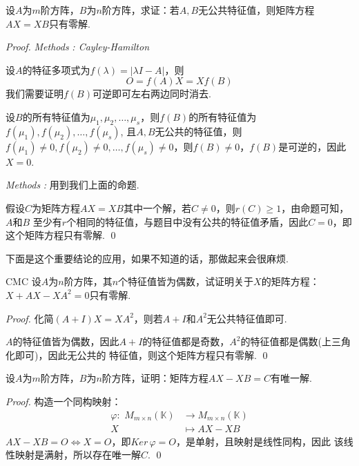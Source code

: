 \begin{proposition}
	设$A$为$m$阶方阵，$B$为$n$阶方阵，求证：若$A,B$无公共特征值，则矩阵方程$AX=XB$只有零解.
\end{proposition}

\begin{proof}
	\emph{Methods\,\,\uppercase\expandafter{}: Cayley-Hamilton}

	设$A$的特征多项式为$f(\lambda) = | \lambda I - A | $，则
	$$
		O = f(A)X = Xf(B)
	$$
	我们需要证明$f(B)$可逆即可左右两边同时消去.

	设$B$的所有特征值为$\mu_1, \mu_2, \dots, \mu_s$，则$f(B)$的所有特征值为$f(\mu_1),f(\mu_2),\dots,f(\mu_s)$,
	且$A,B$无公共的特征值，则$f(\mu_1) \neq 0, f(\mu_2) \neq 0, \dots, f(\mu_s) \neq 0$，则$f(B)\neq 0$，$f(B)$是可逆的，因此$X=0$. 
	
	\emph{Methods\,\,\uppercase\expandafter{}:}
	用到我们上面的命题.

	假设$C$为矩阵方程$AX=XB$其中一个解，若$C \neq 0$，则$r(C) \geq 1$，由命题可知，$A$和$B$
	至少有$r$个相同的特征值，与题目中没有公共的特征值矛盾，因此$C=0$，即这个矩阵方程只有零解.
	\qed{}
\end{proof}

下面是这个重要结论的应用，如果不知道的话，那做起来会很麻烦.

\begin{ex}{CMC}
	设$A$为$n$阶方阵，其$n$个特征值皆为偶数，试证明关于$X$的矩阵方程：$X+AX-XA^2=0$只有零解.
\end{ex}

\begin{proof}
	化简$(A+I)X=XA^2$，则若$A+I$和$A^2$无公共特征值即可.

	$A$的特征值皆为偶数，因此$A+I$的特征值都是奇数，$A^2$的特征值都是偶数(上三角化即可)，因此无公共的
	特征值，则这个矩阵方程只有零解. \qed{}
\end{proof}

\begin{proposition}
	设$A$为$m$阶方阵，$B$为$n$阶方阵，证明：矩阵方程$AX-XB=C$有唯一解.
\end{proposition}

\begin{proof}
	构造一个同构映射：
	\begin{align*}
		\varphi: \,\, M_{m \times n}(\mathbb{K}) &\to M_{m \times n}(\mathbb{K}) \\
			X \quad \quad  &\mapsto AX-XB
	\end{align*}
	$AX-XB=O \Longleftrightarrow X=O$，即$Ker \, \varphi =O$，是单射，且映射是线性同构，因此
	该线性映射是满射，所以存在唯一解$C$. 
	\qed{}

\end{proof}

